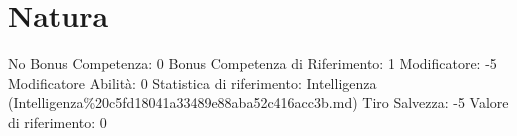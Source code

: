 \section{Natura}\label{natura}

\begin{description}
\tightlist
\item[Tags: ABI]
No Bonus Competenza: 0 Bonus Competenza di Riferimento: 1 Modificatore:
-5 Modificatore Abilità: 0 Statistica di riferimento: Intelligenza
(Intelligenza\%20c5fd18041a33489e88aba52c416acc3b.md) Tiro Salvezza: -5
Valore di riferimento: 0
\end{description}
